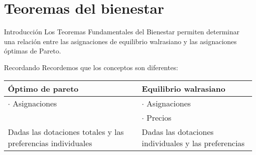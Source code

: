 \section{Teoremas del bienestar}

\begin{frame}{Introducción}
	Los Teoremas Fundamentales del Bienestar permiten determinar una relación entre las asignaciones de equilibrio walrasiano y las asignaciones óptimas de Pareto.
\end{frame}
\begin{frame}{Recordando}
Recordemos que los conceptos son diferentes:
	\begin{center}
		\begin{tabular}{p{5cm}cp{5cm}}
			\hline
				\textbf{Óptimo de pareto} & {} & \textbf{Equilibrio walrasiano} \\
			\hline
				$\cdot$ Asignaciones & {} & $\cdot$ Asignaciones\\
								  {} & {} & $\cdot$ Precios \\
				Dadas las dotaciones totales y las preferencias individuales & {} & Dadas las dotaciones individuales y las preferencias\\
			\hline
		\end{tabular}
	\end{center}
\end{frame}